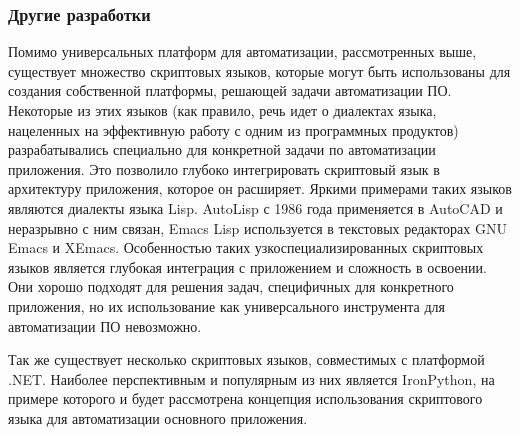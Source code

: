 \subsubsection{Другие разработки}

Помимо универсальных платформ для автоматизации, рассмотренных выше, существует множество скриптовых языков, которые могут быть использованы для создания собственной платформы, решающей задачи автоматизации ПО. Некоторые из этих языков (как правило, речь идет о диалектах языка, нацеленных на эффективную работу с одним из программных продуктов) разрабатывались специально для конкретной задачи по автоматизации приложения. Это позволило глубоко интегрировать скриптовый язык в архитектуру приложения, которое он расширяет. Яркими примерами таких языков являются диалекты языка Lisp. AutoLisp с 1986 года применяется в AutoCAD и неразрывно с ним связан, Emacs Lisp используется в текстовых редакторах GNU Emacs и XEmacs. Особенностью таких узкоспециализированных скриптовых языков является глубокая интеграция с приложением и сложность в освоении. Они хорошо подходят для решения задач, специфичных для конкретного приложения, но их использование как универсального инструмента для автоматизации ПО невозможно.

Так же существует несколько скриптовых языков, совместимых с платформой .NET. Наиболее перспективным и популярным из них является IronPython, на примере которого и будет рассмотрена концепция использования скриптового языка для автоматизации основного приложения.


